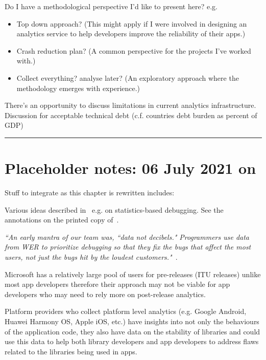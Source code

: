 Do I have a methodological perspective I'd like to present here?
e.g.
\begin{itemize}
    \item Top down approach? (This might apply if I were involved in designing an analytics service to help developers improve the reliability of their apps.)
    \item Crash reduction plan? (A common perspective for the projects I've worked with.) 
    \item Collect everything? analyse later? (An exploratory approach where the methodology emerges with experience.)
\end{itemize}


There's an opportunity to discuss limitations in current analytics infrastructure. Discussion for acceptable technical debt (c.f. countries debt burden as percent of GDP)


\par\noindent\rule{\textwidth}{0.4pt}
\section{Placeholder notes: 06 July 2021 on}
Stuff to integrate as this chapter is rewritten includes:

Various ideas described in~\cite{kinshuman2009_debugging_in_the_very_large, kinshuman2011_debugging_in_the_very_large} e.g. on statistics-based debugging. See the annotations on the printed copy of~\citep{kinshuman2011_debugging_in_the_very_large}. 

\emph{``An early mantra of our team was, ``data not decibels." Programmers use data from WER to prioritize debugging so that they fix the bugs that affect the most users, not just the bugs hit by
the loudest customers."}~\citep{kinshuman2009_debugging_in_the_very_large}. 

Microsoft has a relatively large pool of users for pre-releases (ITU releases) unlike most app developers therefore their approach may not be viable for app developers who may need to rely more on post-release analytics.

Platform providers who collect platform level analytics (e.g. Google Android, Huawei Harmony OS, Apple iOS, etc.) have insights into not only the behaviours of the application code, they also have data on the stability of libraries and could use this data to help both library developers and app developers to address flaws related to the libraries being used in apps.

